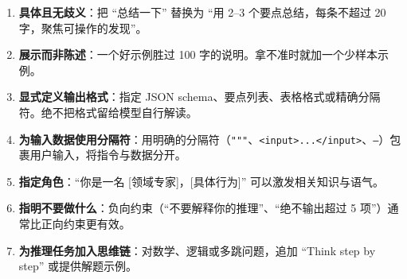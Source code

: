 \begin{keybox}[提示工程检查清单]
\begin{enumerate}
  \item \textbf{具体且无歧义}：把 ``总结一下'' 替换为 ``用 2--3 个要点总结，每条不超过 20 字，聚焦可操作的发现''。
  \item \textbf{展示而非陈述}：一个好示例胜过 100 字的说明。拿不准时就加一个少样本示例。
  \item \textbf{显式定义输出格式}：指定 JSON schema、要点列表、表格格式或精确分隔符。绝不把格式留给模型自行解读。
  \item \textbf{为输入数据使用分隔符}：用明确的分隔符（\texttt{"""}、\texttt{<input>...</input>}、\texttt{---}）包裹用户输入，将指令与数据分开。
  \item \textbf{指定角色}：``你是一名 [领域专家]，[具体行为]'' 可以激发相关知识与语气。
  \item \textbf{指明不要做什么}：负向约束（``不要解释你的推理''、``绝不输出超过 5 项''）通常比正向约束更有效。
  \item \textbf{为推理任务加入思维链}：对数学、逻辑或多跳问题，追加 ``Think step by step'' 或提供解题示例。

\end{enumerate}
\end{keybox}
